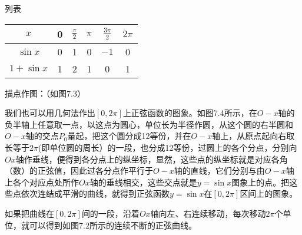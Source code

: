 \begin{solution}
    列表    
\begin{center}
\begin{tabular}{c|ccccc}
    \hline
    $x$ & 0  & $\frac{\pi}{2}$  & $\pi$  & $\frac{3\pi}{2}$  & $2\pi$  \\
    \hline
    $\sin x$   &  0 & 1  & 0  & $-1$  &0\\
    $1+\sin x$   & 1  & 2  & 1  & 0  & 1\\
    \hline
\end{tabular}    
\end{center}

描点作图：（如图7.3）
\begin{figure}[htp]
    \centering
{}
    \caption{}
\end{figure}

\end{solution}

我们也可以用几何法作出$[0, 2\pi]$上正弦函数的图象。如图7.4所示，在$O-x$轴的负半轴上任意取一点，以这点为圆心，单位长为半径作圆，从这个圆的右半圆和$O-x$轴的交点$P_0$量起，把这个圆分成12等份，并在$O-x$轴上，从原点起向右取长等于$2\pi$(即单位圆的周长）的一段，也分成12等份，过圆上的各个分点，分别向$Ox$轴作垂线，便得到各分点上的纵坐标，显然，这些点的纵坐标就是对应各角（数）的正弦值，因此过各分点作平行于$O-x$轴的直线，它们分别与由$O-x$轴上各个对应点处所作$Ox$轴的垂线相交，这些交点就是$y=\sin x$图象上的点。把这些点依次连结成平滑的曲线，就得到正弦函数$y=\sin x$在$[0, 2\pi]$区间上的图象。

如果把曲线在$[0, 2\pi]$间的一段，沿着$Ox$轴向左、右连续移动，每次移动$2\pi$个单位，就可以得到如图7.2所示的连续不断的正弦曲线。

